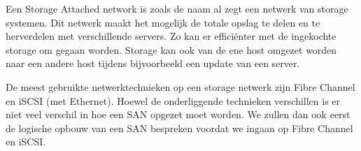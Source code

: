 Een Storage Attached network is zoals de naam al zegt een netwerk van storage systemen. Dit netwerk maakt het mogelijk de totale opslag te delen en te herverdelen met verschillende servers. Zo kan er effici\"enter met de ingekochte storage om gegaan worden. Storage kan ook van de ene host omgezet worden naar een andere host tijdens bijvoorbeeld een update van een server.

De meest gebruikte netwerktechnieken op een storage netwerk zijn Fibre Channel en iSCSI (met Ethernet). Hoewel de onderliggende technieken verschillen is er niet veel verschil in hoe een SAN opgezet moet worden. We zullen dan ook eerst de logische opbouw van een SAN bespreken voordat we ingaan op Fibre Channel en iSCSI.

